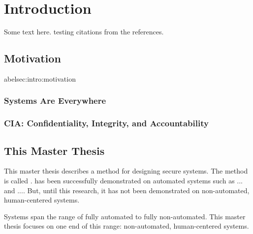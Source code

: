\documentclass[../../main/main.tex]{subfiles}
\begin{document}
\glsresetall

\chapter{Introduction}
Some text here.\cite{ChinOlder} testing citations from the references.

\section{Motivation}\;abel{sec:intro:motivation}
\subsection{Systems Are Everywhere}
\subsection{CIA: Confidentiality, Integrity, and Accountability}


\section{This Master Thesis}\label{sec:thismasterthesis}
\glsresetall
This master thesis describes a method for designing secure systems.  The method is called .    has been successfully demonstrated on automated systems such as ... and ....  But, until this research, it has not been demonstrated on non-automated, human-centered systems.  

Systems span the range of fully automated to fully non-automated.  This master thesis focuses on one end of this range: non-automated, human-centered systems.
\end{document}
